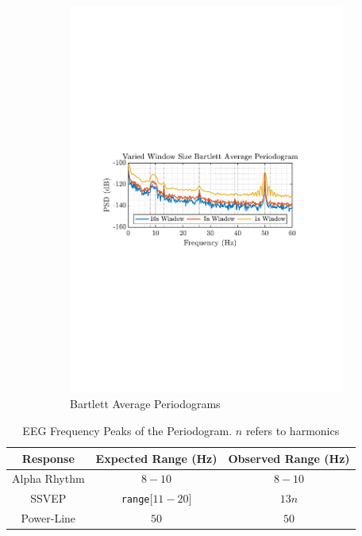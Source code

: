 \documentclass[12pt]{article}
\begin{document}
\begin{figure}[H]
\begin{subfigure}{0.49\textwidth}
			\includegraphics[trim={2.2cm 11.2cm 3.15cm  11.2cm}, clip, width=\textwidth]{../MATLAB/figures/q1_2b_fig02.pdf} 
			\captionsetup{justification=centering}
			\caption{Bartlett Average Periodograms}
		\end{subfigure}
		\captionsetup{justification=centering}
		\caption{}
		\label{fig: 1-2b}
	\end{figure}

	\begin{table}[H]
		\centering
		\begin{tabular}{|c|c||c|}
			\hline
			\textbf{Response} & \textbf{Expected Range} (Hz) & \textbf{Observed Range} (Hz) \\
			\hline
			\hline
			{Alpha Rhythm} & $8 - 10$ & $8-10$ \\
			\hline
			{SSVEP} & \texttt{range}[$11-20$] & $13n$ \\
			\hline
			{Power-Line} & $50$ & $50$ \\
			\hline
		\end{tabular}
		\caption{EEG Frequency Peaks of the Periodogram. $n$ refers to harmonics}
		\label{tab: 1-2b}
	\end{table}
	
\end{document}

